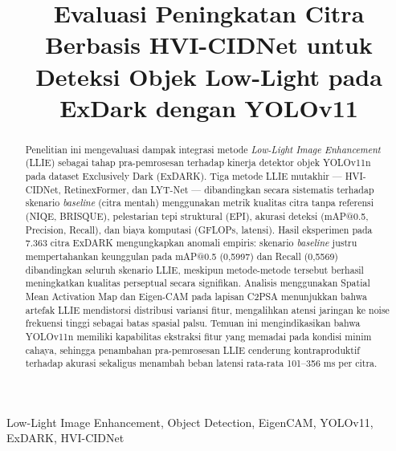 \documentclass[conference]{IEEEtran}
\begin{document}
\title{Evaluasi Peningkatan Citra Berbasis HVI-CIDNet untuk Deteksi Objek Low-Light pada ExDark dengan YOLOv11}

\author{
\and
{}
}


\maketitle

\begin{abstract}
Penelitian ini mengevaluasi dampak integrasi metode \textit{Low-Light Image Enhancement} (LLIE) sebagai tahap pra-pemrosesan terhadap kinerja detektor objek YOLOv11n pada dataset Exclusively Dark (ExDARK). Tiga metode LLIE mutakhir — HVI-CIDNet, RetinexFormer, dan LYT-Net — dibandingkan secara sistematis terhadap skenario \textit{baseline} (citra mentah) menggunakan metrik kualitas citra tanpa referensi (NIQE, BRISQUE), pelestarian tepi struktural (EPI), akurasi deteksi (mAP@0.5, Precision, Recall), dan biaya komputasi (GFLOPs, latensi). Hasil eksperimen pada 7.363 citra ExDARK mengungkapkan anomali empiris: skenario \textit{baseline} justru mempertahankan keunggulan pada mAP@0.5 (0,5997) dan Recall (0,5569) dibandingkan seluruh skenario LLIE, meskipun metode-metode tersebut berhasil meningkatkan kualitas perseptual secara signifikan. Analisis menggunakan Spatial Mean Activation Map dan Eigen-CAM pada lapisan C2PSA menunjukkan bahwa artefak LLIE mendistorsi distribusi variansi fitur, mengalihkan atensi jaringan ke noise frekuensi tinggi sebagai batas spasial palsu. Temuan ini mengindikasikan bahwa YOLOv11n memiliki kapabilitas ekstraksi fitur yang memadai pada kondisi minim cahaya, sehingga penambahan pra-pemrosesan LLIE cenderung kontraproduktif terhadap akurasi sekaligus menambah beban latensi rata-rata 101–356 ms per citra.
\end{abstract}

\begin{IEEEkeywords}
Low-Light Image Enhancement, Object Detection, EigenCAM, YOLOv11, ExDARK, HVI-CIDNet
\end{IEEEkeywords}
\end{document}
